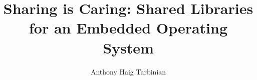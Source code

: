 \documentclass[12pt]{ucsddissertation}
\title{Sharing is Caring: Shared Libraries for an Embedded Operating System}
\author{Anthony Haig Tarbinian}
\begin{document}
\frontmatter
\maketitle
\makecopyright
\makesignature
%
%
%
%
%

\tableofcontents
\listoffigures
\listoftables
\end{document}
